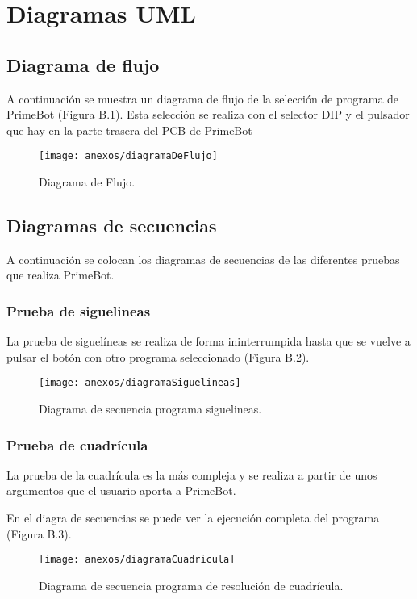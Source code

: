 \newpage
\section{Diagramas UML}

\subsection{Diagrama de flujo}

A continuación se muestra un diagrama de flujo de la selección de programa de PrimeBot (Figura B.1).
Esta selección se realiza con el selector DIP y el pulsador que hay en la parte trasera del PCB de PrimeBot

\begin{figure}[h]
	\centering
	\texttt{[image: anexos/diagramaDeFlujo]}
	\caption{Diagrama de Flujo.}
	\label{fig:B.1}
\end{figure}
\newpage
\subsection{Diagramas de secuencias}
A continuación se colocan los diagramas de secuencias de las diferentes pruebas que realiza PrimeBot.
\subsubsection{Prueba de siguelineas}
La prueba de siguelíneas se realiza de forma ininterrumpida hasta que se vuelve a pulsar el botón con otro programa seleccionado (Figura B.2).
\begin{figure}[h]
	\centering
	\texttt{[image: anexos/diagramaSiguelineas]}
	\caption{Diagrama de secuencia programa siguelineas.}
	\label{fig:B.2}
\end{figure}

\subsubsection{Prueba de cuadrícula}

La prueba de la cuadrícula es la más compleja y se realiza a partir de unos argumentos que el usuario aporta a PrimeBot.

En el diagra de secuencias se puede ver la ejecución completa del programa (Figura B.3).

\begin{figure}[h]
	\centering
	\texttt{[image: anexos/diagramaCuadricula]}
	\caption{Diagrama de secuencia programa de resolución de cuadrícula.}
	\label{fig:B.3}
\end{figure}
\newpage
